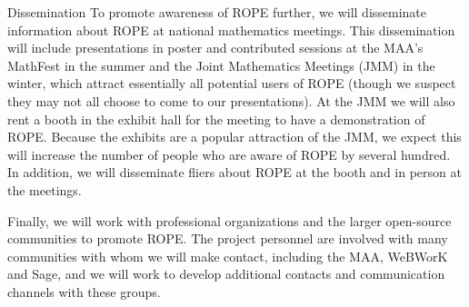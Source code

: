 \documentclass[11pt]{article}
\begin{document}
\begin{section}{Dissemination}
To promote awareness of ROPE further, we will disseminate
information about ROPE at national mathematics meetings.  This
dissemination will include presentations in poster and contributed
sessions at the MAA's MathFest in the summer and the Joint Mathematics
Meetings (JMM) in the winter, which attract essentially all potential
users of ROPE (though we suspect they may not all choose to come to our
presentations).  At the JMM we will also rent a booth in the exhibit hall
for the meeting to have a demonstration of ROPE.  Because the exhibits
are a popular attraction of the JMM, we expect this will increase the
number of people who are aware of ROPE by several hundred.  In
addition, we will disseminate fliers about ROPE at the booth and in
person at the meetings.

Finally, we will work with professional organizations and the larger
open-source communities to promote ROPE.  The project personnel are
involved with many communities with whom we will make contact, including
the MAA, WeBWorK and Sage, and we will work to develop additional contacts
and communication channels with these groups.

\end{section}
\end{document}
